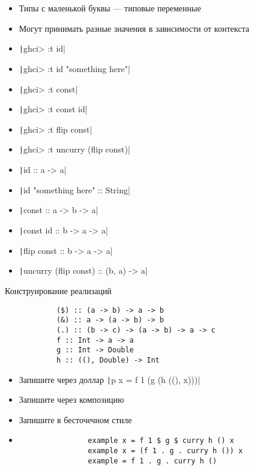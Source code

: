 
    \begin{frame}[fragile]{\secname}
        \begin{itemize}
            \item Типы с маленькой буквы --- типовые переменные
            \item Могут принимать разные значения в зависимости от контекста
            \item[\todo] \texttt|ghci> :t id|
            \item[\todo] \texttt|ghci> :t id "something here"|
            \item[\todo] \texttt|ghci> :t const|
            \item[\todo] \texttt|ghci> :t const id|
            \item[\todo] \texttt|ghci> :t flip const|
            \item[\todo] \texttt|ghci> :t uncurry (flip const)|
            \item[\answer] \pause \texttt|id :: a -> a|
            \item[\answer] \pause \texttt|id "something here" :: String|
            \item[\answer] \pause \texttt|const :: a -> b -> a|
            \item[\answer] \pause \texttt|const id :: b -> a -> a|
            \item[\answer] \pause \texttt|flip const :: b -> a -> a|
            \item[\answer] \pause \texttt|uncurry (flip const) :: (b, a) -> a|
        \end{itemize}
    \end{frame}
    
    \begin{frame}[fragile]{Конструирование реализаций}
        \begin{verbatim}
            ($) :: (a -> b) -> a -> b
            (&) :: a -> (a -> b) -> b
            (.) :: (b -> c) -> (a -> b) -> a -> c
            f :: Int -> a -> a
            g :: Int -> Double
            h :: ((), Double) -> Int
        \end{verbatim}
        \begin{itemize}
            \item[\todo] Запишите через доллар \texttt|p x = f 1 (g (h ((), x)))|
            \item[\todo] Запишите через композицию
            \item[\todo] Запишите в бесточечном стиле
            \item[\answer] \pause
            \begin{verbatim}
                example x = f 1 $ g $ curry h () x
                example x = (f 1 . g . curry h ()) x
                example = f 1 . g . curry h ()
            \end{verbatim}
        \end{itemize}
    \end{frame}

